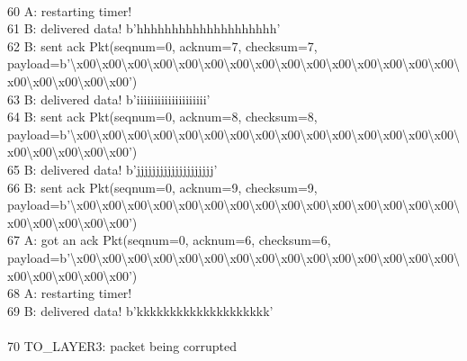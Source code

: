 \documentclass{article}
\begin{document}
{\\
60 A: restarting timer! \\
61 B: delivered data! b'hhhhhhhhhhhhhhhhhhhh' \\
62 B: sent ack Pkt(seqnum=0, acknum=7, checksum=7,
payload=b'\textbackslash{}x00\textbackslash{}x00\textbackslash{}x00\textbackslash{}x00\textbackslash{}x00\textbackslash{}x00\textbackslash{}x00\textbackslash{}x00\textbackslash{}x00\textbackslash{}x00\textbackslash{}x00\textbackslash{}x00\textbackslash{}x00\textbackslash{}x00\textbackslash{}x00\textbackslash{}x00\textbackslash{}x00\textbackslash{}x00\textbackslash{}x00\textbackslash{}x00')
\\
63 B: delivered data! b'iiiiiiiiiiiiiiiiiiii' \\
64 B: sent ack Pkt(seqnum=0, acknum=8, checksum=8,
payload=b'\textbackslash{}x00\textbackslash{}x00\textbackslash{}x00\textbackslash{}x00\textbackslash{}x00\textbackslash{}x00\textbackslash{}x00\textbackslash{}x00\textbackslash{}x00\textbackslash{}x00\textbackslash{}x00\textbackslash{}x00\textbackslash{}x00\textbackslash{}x00\textbackslash{}x00\textbackslash{}x00\textbackslash{}x00\textbackslash{}x00\textbackslash{}x00\textbackslash{}x00')
\\
65 B: delivered data! b'jjjjjjjjjjjjjjjjjjjj' \\
66 B: sent ack Pkt(seqnum=0, acknum=9, checksum=9,
payload=b'\textbackslash{}x00\textbackslash{}x00\textbackslash{}x00\textbackslash{}x00\textbackslash{}x00\textbackslash{}x00\textbackslash{}x00\textbackslash{}x00\textbackslash{}x00\textbackslash{}x00\textbackslash{}x00\textbackslash{}x00\textbackslash{}x00\textbackslash{}x00\textbackslash{}x00\textbackslash{}x00\textbackslash{}x00\textbackslash{}x00\textbackslash{}x00\textbackslash{}x00')
\\
67 A: got an ack Pkt(seqnum=0, acknum=6, checksum=6,
payload=b'\textbackslash{}x00\textbackslash{}x00\textbackslash{}x00\textbackslash{}x00\textbackslash{}x00\textbackslash{}x00\textbackslash{}x00\textbackslash{}x00\textbackslash{}x00\textbackslash{}x00\textbackslash{}x00\textbackslash{}x00\textbackslash{}x00\textbackslash{}x00\textbackslash{}x00\textbackslash{}x00\textbackslash{}x00\textbackslash{}x00\textbackslash{}x00\textbackslash{}x00')
\\
68 A: restarting timer! \\
69 B: delivered data! b'kkkkkkkkkkkkkkkkkkkk' \\
 \\
70     \hspace*{10mm}  TO\_LAYER3: packet being corrupted \\
}
\end{document}
